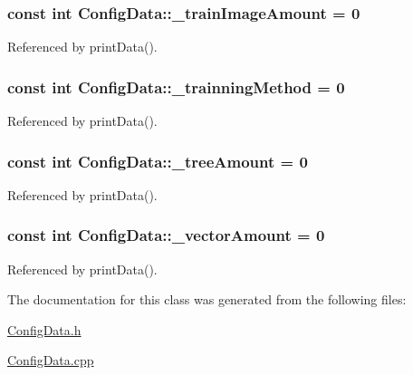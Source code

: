 \subsubsection[{\texorpdfstring{\+\_\+train\+Image\+Amount}{_trainImageAmount}}]{\setlength{\rightskip}{0pt plus 5cm}const int Config\+Data\+::\+\_\+train\+Image\+Amount = 0\hspace{0.3cm}{\ttfamily [private]}}\hypertarget{classConfigData_aa9ece3a15e191b330db21d48b4f092e2}{}\label{classConfigData_aa9ece3a15e191b330db21d48b4f092e2}


Referenced by print\+Data().

\subsubsection[{\texorpdfstring{\+\_\+trainning\+Method}{_trainningMethod}}]{\setlength{\rightskip}{0pt plus 5cm}const int Config\+Data\+::\+\_\+trainning\+Method = 0\hspace{0.3cm}{\ttfamily [private]}}\hypertarget{classConfigData_a161bf96e6b8d33d2bf10b86f82546b36}{}\label{classConfigData_a161bf96e6b8d33d2bf10b86f82546b36}


Referenced by print\+Data().

\subsubsection[{\texorpdfstring{\+\_\+tree\+Amount}{_treeAmount}}]{\setlength{\rightskip}{0pt plus 5cm}const int Config\+Data\+::\+\_\+tree\+Amount = 0\hspace{0.3cm}{\ttfamily [private]}}\hypertarget{classConfigData_a4a8f85fa6d12865575b2226939964a09}{}\label{classConfigData_a4a8f85fa6d12865575b2226939964a09}


Referenced by print\+Data().

\subsubsection[{\texorpdfstring{\+\_\+vector\+Amount}{_vectorAmount}}]{\setlength{\rightskip}{0pt plus 5cm}const int Config\+Data\+::\+\_\+vector\+Amount = 0\hspace{0.3cm}{\ttfamily [private]}}\hypertarget{classConfigData_af590033be1d5469272aa1010353232d5}{}\label{classConfigData_af590033be1d5469272aa1010353232d5}


Referenced by print\+Data().



The documentation for this class was generated from the following files\+:\begin{DoxyCompactItemize}
\item 
\hyperlink{ConfigData_8h}{Config\+Data.\+h}\item 
\hyperlink{ConfigData_8cpp}{Config\+Data.\+cpp}\end{DoxyCompactItemize}
